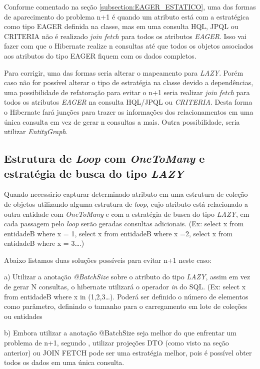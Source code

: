 Conforme comentado na seção \ref{subsection:EAGER_ESTATICO}, uma das formas de aparecimento do problema n+1 é quando um atributo está com a estratégica como tipo EAGER definida na classe, mas em uma consulta HQL, JPQL ou CRITERIA não é realizado \textit{join fetch} para todos os atributos \textit{EAGER}. Isso vai fazer com que o Hibernate realize n consultas até que todos os objetos associados aos atributos do tipo EAGER fiquem com os dados completos. 

Para corrigir, uma das formas seria alterar o mapeamento para \textit{LAZY}. Porém caso não for possível alterar o tipo de estratégia na classe devido a dependências, uma possibilidade de refatoração para evitar o n+1 seria realizar \textit{join fetch} para todos os atributos \textit{EAGER} na consulta HQL/JPQL ou \textit{CRITERIA}. Desta forma o Hibernate fará junções para trazer as informações dos relacionamentos em uma única consulta em vez de gerar n consultas a mais. Outra possibilidade, seria utilizar \textit{EntityGraph}.


\subsection{Estrutura de \textit{Loop} com \textit{OneToMany} e estratégia de busca do tipo \textit{LAZY}}

Quando necessário capturar determinado atributo em uma estrutura de coleção de objetos utilizando alguma estrutura de \textit{loop}, cujo atributo está relacionado a outra entidade com \textit{OneToMany} e com a estratégia de busca do tipo \textit{LAZY}, em cada passagem pelo \textit{loop} serão geradas consultas adicionais. (Ex: select x from entidadeB where x = 1, select x from entidadeB where x =2,  select x from entidadeB where x = 3….) \cite{Chen:2014:Performance:Anti-patterns}

Abaixo listamos duas soluções possíveis para evitar n+1 neste caso:

a) Utilizar a anotação \textit{@BatchSize} sobre o atributo do tipo \textit{LAZY}, assim em vez de gerar N consultas, o hibernate utilizará o operador \textit{in} do SQL. (Ex:  select x from entidadeB where x in (1,2,3…). Poderá ser definido o número de elementos como parâmetro, definindo o tamanho para o carregamento em lote de coleções ou entidades \cite{Chen:2014:Performance:Anti-patterns}

b) Embora utilizar a anotação @BatchSize seja melhor do que enfrentar um problema de n+1, segundo \cite{hibernate_543}, utilizar projeções DTO (como visto na seção anterior) ou JOIN FETCH pode ser uma estratégia melhor, pois é possível obter todos os dados em uma única consulta. 

